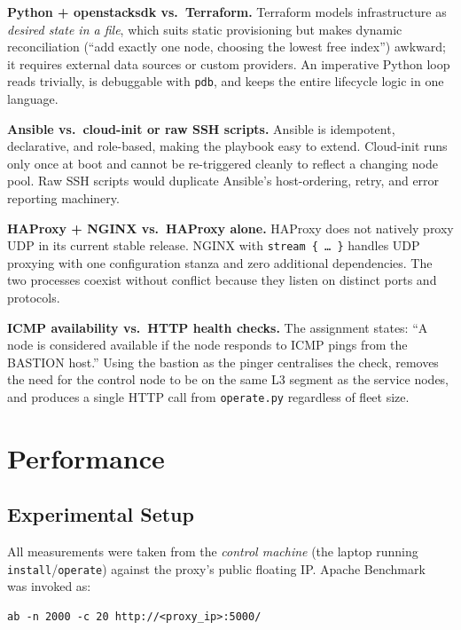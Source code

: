 \documentclass[conference]{IEEEtran}
\begin{document}
\textbf{Python + openstacksdk vs.\ Terraform.}
Terraform models infrastructure as \emph{desired state in a file},
which suits static provisioning but makes dynamic reconciliation
(``add exactly one node, choosing the lowest free index'') awkward;
it requires external data sources or custom providers.  An imperative
Python loop reads trivially, is debuggable with \texttt{pdb}, and
keeps the entire lifecycle logic in one language.

\textbf{Ansible vs.\ cloud-init or raw SSH scripts.}
Ansible is idempotent, declarative, and role-based, making the
playbook easy to extend.  Cloud-init runs only once at boot and cannot
be re-triggered cleanly to reflect a changing node pool.  Raw SSH
scripts would duplicate Ansible's host-ordering, retry, and error
reporting machinery.

\textbf{HAProxy + NGINX vs.\ HAProxy alone.}
HAProxy does not natively proxy UDP in its current stable release.
NGINX with \texttt{stream \{ … \}} handles UDP proxying with one
configuration stanza and zero additional dependencies.  The two
processes coexist without conflict because they listen on distinct
ports and protocols.

\textbf{ICMP availability vs.\ HTTP health checks.}
The assignment states: ``A node is considered available if the node
responds to ICMP pings from the BASTION host.'' Using the bastion as
the pinger centralises the check, removes the need for the control
node to be on the same L3 segment as the service nodes, and produces
a single HTTP call from \texttt{operate.py} regardless of fleet size.

\section{Performance}
\label{sec:performance}

\subsection{Experimental Setup}

All measurements were taken from the \emph{control machine} (the
laptop running \texttt{install}/\texttt{operate}) against the proxy's
public floating IP.  Apache Benchmark~\cite{abdoc} was invoked as:

\begin{lstlisting}
ab -n 2000 -c 20 http://<proxy_ip>:5000/
\end{lstlisting}
\end{document}
